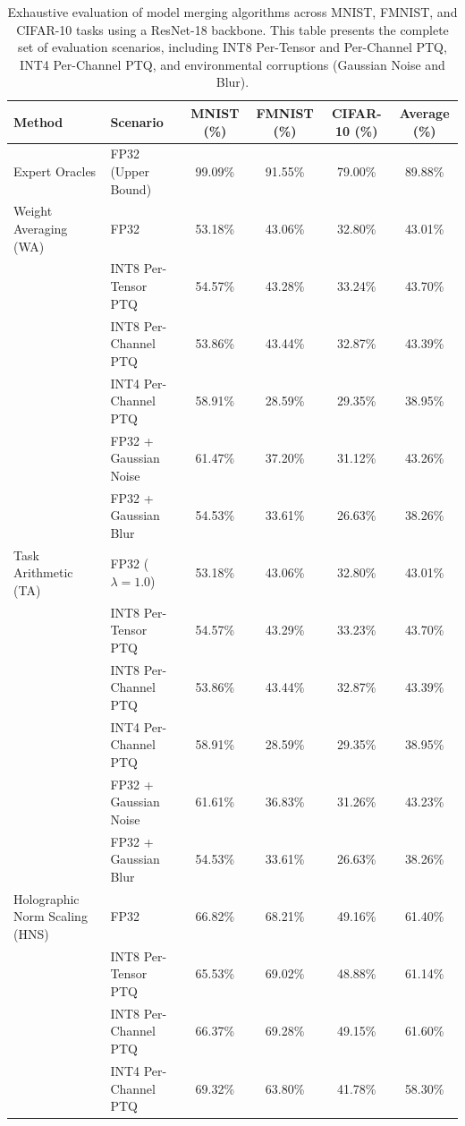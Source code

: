 \documentclass{article}
\theoremstyle{plain}
\theoremstyle{definition}
\theoremstyle{remark}
\begin{document}
\begin{table}[h]
\caption{Exhaustive evaluation of model merging algorithms across MNIST, FMNIST, and CIFAR-10 tasks using a ResNet-18 backbone. This table presents the complete set of evaluation scenarios, including INT8 Per-Tensor and Per-Channel PTQ, INT4 Per-Channel PTQ, and environmental corruptions (Gaussian Noise and Blur).}
\label{tab:exhaustive_results_appendix}
\vskip 0.15in
\begin{center}
\begin{small}
\setlength{\tabcolsep}{3.5pt}
\begin{tabular}{llcccc}
\toprule
Method & Scenario & MNIST (\%) & FMNIST (\%) & CIFAR-10 (\%) & Average (\%) \\
\midrule
Expert Oracles & FP32 (Upper Bound) & 99.09\% & 91.55\% & 79.00\% & 89.88\% \\
\midrule
Weight Averaging (WA) & FP32 & 53.18\% & 43.06\% & 32.80\% & 43.01\% \\
& INT8 Per-Tensor PTQ & 54.57\% & 43.28\% & 33.24\% & 43.70\% \\
& INT8 Per-Channel PTQ & 53.86\% & 43.44\% & 32.87\% & 43.39\% \\
& INT4 Per-Channel PTQ & 58.91\% & 28.59\% & 29.35\% & 38.95\% \\
& FP32 + Gaussian Noise & 61.47\% & 37.20\% & 31.12\% & 43.26\% \\
& FP32 + Gaussian Blur & 54.53\% & 33.61\% & 26.63\% & 38.26\% \\
\midrule
Task Arithmetic (TA) & FP32 ($\lambda = 1.0$) & 53.18\% & 43.06\% & 32.80\% & 43.01\% \\
& INT8 Per-Tensor PTQ & 54.57\% & 43.29\% & 33.23\% & 43.70\% \\
& INT8 Per-Channel PTQ & 53.86\% & 43.44\% & 32.87\% & 43.39\% \\
& INT4 Per-Channel PTQ & 58.91\% & 28.59\% & 29.35\% & 38.95\% \\
& FP32 + Gaussian Noise & 61.61\% & 36.83\% & 31.26\% & 43.23\% \\
& FP32 + Gaussian Blur & 54.53\% & 33.61\% & 26.63\% & 38.26\% \\
\midrule
Holographic Norm Scaling (HNS) & FP32 & 66.82\% & 68.21\% & 49.16\% & 61.40\% \\
& INT8 Per-Tensor PTQ & 65.53\% & 69.02\% & 48.88\% & 61.14\% \\
& INT8 Per-Channel PTQ & 66.37\% & 69.28\% & 49.15\% & 61.60\% \\
& INT4 Per-Channel PTQ & 69.32\% & 63.80\% & 41.78\% & 58.30\% \\

\end{tabular}
\end{small}
\end{center}
\end{table}
\end{document}
